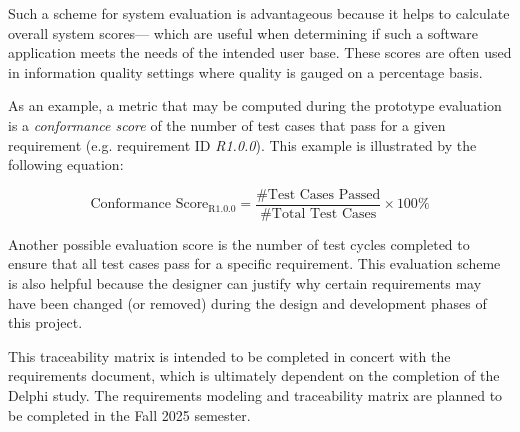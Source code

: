 Such a scheme for system evaluation is advantageous because it helps to calculate overall system scores--- which are useful when determining if such a software application meets the needs of the intended user base. These scores are often used in information quality settings where quality is gauged on a percentage basis.

As an example, a metric that may be computed during the prototype evaluation is a \textit{conformance score} of the number of test cases that pass for a given requirement (e.g. requirement ID \textit{R1.0.0}). This example is illustrated by the following equation:

\[
\text{Conformance Score}_{\text{R1.0.0}} = 
\frac{\text{\# Test Cases Passed}}{\text{\# Total Test Cases}} 
\times 100\%
\]

Another possible evaluation score is the number of test cycles completed to ensure that all test cases pass for a specific requirement. This evaluation scheme is also helpful because the designer can justify why certain requirements may have been changed (or removed) during the design and development phases of this project.

This traceability matrix is intended to be completed in concert with the requirements document, which is ultimately dependent on the completion of the Delphi study. The requirements modeling and traceability matrix are planned to be completed in the Fall 2025 semester.
